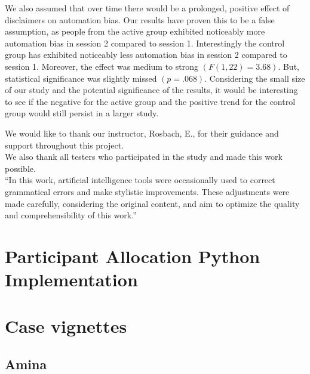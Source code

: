 \documentclass[sigconf,natbib=false]{acmart}
\begin{document}
We also assumed that over time there would be a prolonged, positive effect of disclaimers on automation bias.
Our results have proven this to be a false assumption, as people from the active group exhibited noticeably more automation bias in session 2 compared to session 1.
Interestingly the control group has exhibited noticeably less automation bias in session 2 compared to session 1.
Moreover, the effect was medium to strong \((F(1,22)=3.68)\).
But, statistical significance was slightly missed \((p=.068)\).
Considering the small size of our study and the potential significance of the results, it would be interesting to see if the negative for the active group and the positive trend for the control group would still persist in a larger study.



\begin{sloppypar}
\printbibliography
\end{sloppypar}


\begin{acks}
We would like to thank our instructor, Rosbach, E., for their guidance and support throughout this project.\\
We also thank all testers who participated in the study and made this work possible.\\
\enquote{In this work, artificial intelligence tools were occasionally used to correct grammatical errors and make stylistic improvements.
These adjustments were made carefully, considering the original content, and aim to optimize the quality and comprehensibility of this work.}\autocite[slide 54]{ai-usage-disclaimer}
\end{acks}


\appendix
\tableofcontents
\listoffigures
\printglossaries
\clearpage


\section{Participant Allocation Python Implementation}
\label{app:palloc}
 \faDownload


\section{Case vignettes}
\label{app:cases}

\subsection{Amina \autocite[slide~8]{dbjr_stoerungsbilder}}
\label{app:AminaFull}
\end{document}
